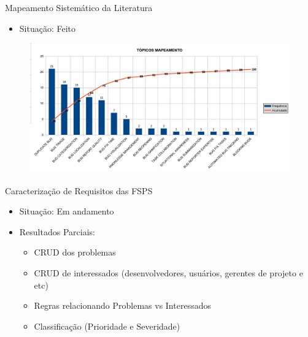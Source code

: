 \documentclass[t,14pt,mathserif]{beamer}
\begin{document}
\begin{frame}{Mapeamento Sistemático da Literatura}
	\begin{itemize}
		\item Situação: Feito
    \end{itemize}

	\begin{figure}[hbtp]
		\centering
		\includegraphics[scale=.39]{../img/mapeamento.png}
	\end{figure}
\end{frame}

\begin{frame}{Caracterização de Requisitos das FSPS}
		\begin{itemize}
			\item Situação: Em andamento
			\item Resultados Parciais:
				\begin{itemize}
					 \item CRUD dos problemas
                     \item CRUD de interessados (desenvolvedores, usuários,
                         gerentes de projeto e etc)
					 \item Regras relacionando Problemas vs Interessados
		             \item Classificação (Prioridade e Severidade)
				\end{itemize}
	    \end{itemize}
\end{frame}
\end{document}
